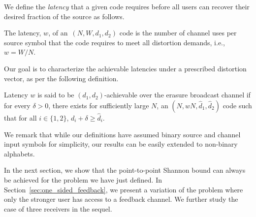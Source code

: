 We define the {\it latency} that a given code requires before all users can recover their desired fraction of the source as follows.
\begin{mydef}
\label{def:latency_two_users}
	The latency, $w$, of an~$(N, W, d_{1}, d_{2})$ code is the number of channel uses per source symbol that the code requires to meet all distortion demands, i.e., $w = W/N$.
\end{mydef}
%
Our goal is to characterize the achievable latencies under a prescribed distortion vector,
as per the following definition.
\begin{mydef}
\label{def:achievable_general_feedback}
	Latency $w$ is said to be $(d_{1}, d_{2})$-achievable over the erasure broadcast channel if for every $\delta > 0$, there exists for sufficiently large $N$, an $(N, wN, \hat{d}_{1}, \hat{d}_{2})$ code such that for all $i \in \{1, 2\}$, $d_{i}+\delta \geq \hat{d}_{i}$.
	
	

\end{mydef}

\begin{remark}
	We remark that while our definitions have assumed binary source and channel input symbols for simplicity, our results can be easily extended to non-binary alphabets.
\end{remark}

In the next section, we show that the point-to-point Shannon bound can always be achieved for the problem we have just defined.  In Section~\ref{sec:one_sided_feedback}, we present a variation of the problem where only the stronger user has access to a feedback channel.  We further study the case of three receivers in the sequel.  


